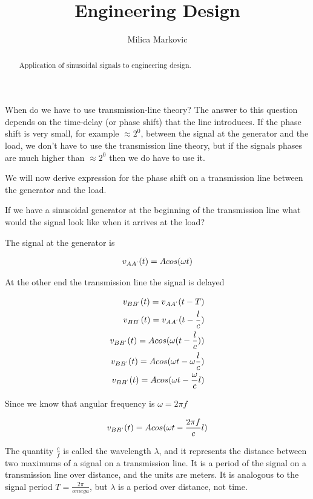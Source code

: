 \documentclass{ximera}
\title{Engineering Design}
\author{Milica Markovic}
\begin{document}
  
\begin{abstract}  
Application of sinusoidal signals to engineering design.
\end{abstract}  
\maketitle

When do we have to use transmission-line theory? The answer to this question depends on the time-delay (or phase shift) that the line introduces. If the phase shift is very small, for example $\approx 2^0$, between the signal at the generator and the load, we don't have to use the transmission line theory, but if the signals phases are much higher than  $\approx 2^0$ then we do have to use it.

We will now derive expression for the phase shift on a transmission line between the generator and the load.

If we have a sinusoidal generator at the beginning of the transmission line what would the signal look like when it arrives at the load?

The signal at the generator is 

\begin{eqnarray}
v_{AA^`}(t)=A cos(\omega t)
\end{eqnarray}

At the other end the transmission line the signal is delayed


\begin{eqnarray}
v_{BB^`}(t)=v_{AA^`}(t-T) \\
v_{BB^`}(t)=v_{AA^`}(t-\frac{l}{c}) \\
v_{BB^`}(t)=A cos(\omega (t - \frac{l}{c}))  \\
v_{BB^`}(t)=A cos(\omega t - \omega \frac{l}{c}) \\
v_{BB^`}(t)=A cos(\omega t -  \frac{\omega }{c} l) 
\end{eqnarray}

Since we know that angular frequency is  $\omega = 2 \pi f$


\begin{eqnarray}
v_{BB^`}(t)=A cos(\omega t -  \frac{ 2 \pi f }{c} l)
\end{eqnarray}

The quantity $\frac{c}{f}$ is called the wavelength $\lambda$, and it represents the distance between two maximums of a signal on a transmission line. It is a period of the signal on a transmission line over distance, and the units are meters. It is analogous to the signal period $T=\frac{2 \pi}{omega}$, but $\lambda$ is a period over distance, not time.
\end{document}
